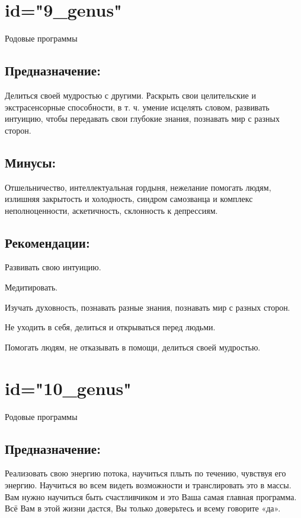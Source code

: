 \endsection

\section{id="9_genus"}{Родовые программы}

\subsection{Предназначение:}
Делиться своей мудростью с другими. Раскрыть свои целительские и 
экстрасенсорные способности, в т. ч. умение исцелять словом, 
развивать интуицию, чтобы передавать свои глубокие знания, 
познавать мир с разных сторон.
\endsubsection

\subsection{Минусы:}
Отшельничество, интеллектуальная гордыня, нежелание помогать 
людям, излишняя закрытость и холодность, синдром самозванца и 
комплекс неполноценности, аскетичность, склонность к депрессиям.
\endsubsection

\subsection{Рекомендации:}
\item Развивать свою интуицию.
\item Медитировать.
\item Изучать духовность, познавать разные знания, познавать мир 
с разных сторон.
\item Не уходить в себя, делиться и открываться перед людьми.
\item Помогать людям, не отказывать в помощи, делиться своей мудростью.
\endsubsection

\endsection

\section{id="10_genus"}{Родовые программы}

\subsection{Предназначение:}
Реализовать свою энергию потока, научиться плыть по течению, 
чувствуя его энергию. Научиться во всем видеть возможности и 
транслировать это в массы. Вам нужно научиться быть счастливчиком 
и это Ваша самая главная программа. Всё Вам в этой жизни дастся, 
Вы только доверьтесь и всему говорите «да».
\endsubsection

